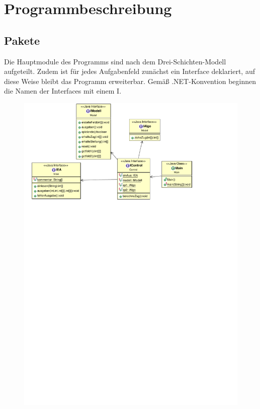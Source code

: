 \chapter{Programmbeschreibung}
\label{chap:Programmbeschreibung}

\section{Pakete}
Die Hauptmodule des Programms sind nach dem Drei-Schichten-Modell aufgeteilt. Zudem ist für jedes Aufgabenfeld zunächst ein Interface deklariert, auf diese Weise bleibt das Programm erweiterbar. Gemäß .NET-Konvention beginnen die Namen der Interfaces mit einem \glqq I\grqq.
\newline
\begin{figure}
\includegraphics[viewport=50 50 0 0]{Diagramme/kontrolledia.pdf}
\end{figure}
